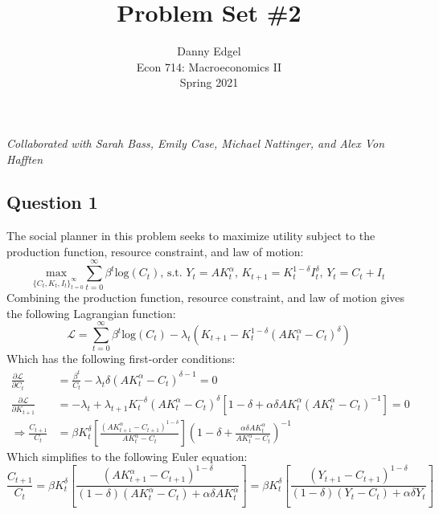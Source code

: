 \documentclass{article}
\newcommand{\loge}[1]{\text{log}\left(#1\right)}
\newcommand{\usmax}[1]{\underset{#1}{\text{max }}}
\renewcommand{\L}{\mathcal{L}}
\newcommand{\suminf}{\sum_{t=0}^\infty}
\begin{document}
\title{	Problem Set \#2 }
\author{ 	Danny Edgel 					\\ 
			Econ 714: Macroeconomics II		\\
			Spring 2021						\\
		}
\maketitle\thispagestyle{empty}


\noindent\textit{Collaborated with Sarah Bass, Emily Case, Michael Nattinger, and Alex Von Hafften}


\subsection*{Question 1}
The social planner in this problem seeks to maximize utility subject to the production function, resource constraint, and law of motion:
\[
	\usmax{\{C_t,K_t,I_t\}_{t=0}^\infty}\suminf\beta^t\loge{C_t}\text{, s.t. }Y_t=AK_t^\alpha\text{, }K_{t+1}=K_t^{1-\delta}I_t^\delta\text{, }Y_t=C_t + I_t
\]
Combining the production function, resource constraint, and law of motion gives the following Lagrangian function:
\[
	\L = \suminf \beta^t\loge{C_t} - \lambda_t\left(K_{t+1} - K_t^{1-\delta}(AK_t^\alpha-C_t)^\delta\right)
\]
Which has the following first-order conditions:
\begin{align*}
	\frac{\partial\L}{\partial C_t} 	&= \frac{\beta^t}{C_t} - \lambda_t\delta\left(AK_t^\alpha-C_t\right)^{\delta-1} 						= 0	\\
	\frac{\partial\L}{\partial K_{t+1}} 
		&= -\lambda_t + \lambda_{t+1}K_t^{-\delta}(AK_t^\alpha-C_t)^\delta\left[1-\delta + \alpha\delta AK_t^\alpha(AK_t^\alpha-C_t)^{-1}\right] = 0 	\\
	\Rightarrow	\frac{C_{t+1}}{C_t} &= \beta K_t^\delta\left[\frac{(AK_{t+1}^\alpha-C_{t+1})^{1-\delta}}{AK_t^\alpha-C_t}\right]\left(1-\delta+\frac{\alpha\delta AK_t^\alpha}{AK_t^\alpha-C_t}\right)^{-1}
\end{align*}
Which simplifies to the following Euler equation:
\[
	\frac{C_{t+1}}{C_t} = \beta K_t^\delta\left[\frac{(AK_{t+1}^\alpha-C_{t+1})^{1-\delta}}{(1-\delta)(AK_t^\alpha-C_t) + \alpha\delta AK_t^\alpha}\right] 
									=  \beta K_t^\delta\left[\frac{(Y_{t+1}-C_{t+1})^{1-\delta}}{(1-\delta)(Y_t-C_t) + \alpha\delta Y_t}\right]
\]
\end{document}
